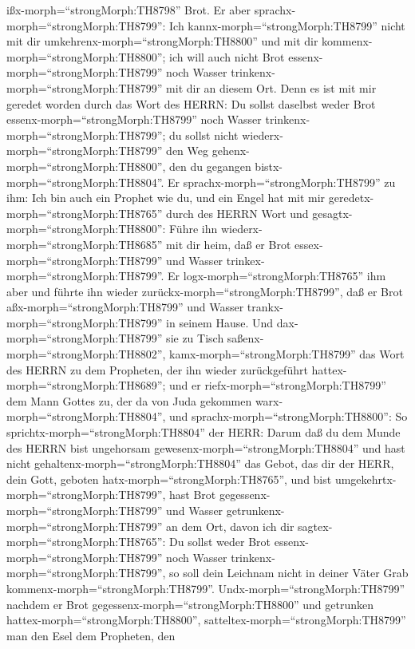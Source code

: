 ißx-morph=``strongMorph:TH8798'' Brot.  Er aber
sprachx-morph=``strongMorph:TH8799'': Ich
kannx-morph=``strongMorph:TH8799'' nicht mit dir
umkehrenx-morph=``strongMorph:TH8800'' und mit dir
kommenx-morph=``strongMorph:TH8800''; ich will auch nicht Brot
essenx-morph=``strongMorph:TH8799'' noch Wasser
trinkenx-morph=``strongMorph:TH8799'' mit dir an diesem Ort.
 Denn es ist mit mir geredet worden durch das Wort des
HERRN: Du sollst daselbst weder Brot essenx-morph=``strongMorph:TH8799''
noch Wasser trinkenx-morph=``strongMorph:TH8799''; du sollst nicht
wiederx-morph=``strongMorph:TH8799'' den Weg
gehenx-morph=``strongMorph:TH8800'', den du gegangen
bistx-morph=``strongMorph:TH8804''.  Er
sprachx-morph=``strongMorph:TH8799'' zu ihm: Ich bin auch ein Prophet
wie du, und ein Engel hat mit mir geredetx-morph=``strongMorph:TH8765''
durch des HERRN Wort und gesagtx-morph=``strongMorph:TH8800'': Führe ihn
wiederx-morph=``strongMorph:TH8685'' mit dir heim, daß er Brot
essex-morph=``strongMorph:TH8799'' und Wasser
trinkex-morph=``strongMorph:TH8799''. Er
logx-morph=``strongMorph:TH8765'' ihm aber  und führte ihn
wieder zurückx-morph=``strongMorph:TH8799'', daß er Brot
aßx-morph=``strongMorph:TH8799'' und Wasser
trankx-morph=``strongMorph:TH8799'' in seinem Hause.  Und
dax-morph=``strongMorph:TH8799'' sie zu Tisch
saßenx-morph=``strongMorph:TH8802'', kamx-morph=``strongMorph:TH8799''
das Wort des HERRN zu dem Propheten, der ihn wieder zurückgeführt
hattex-morph=``strongMorph:TH8689'';  und er
riefx-morph=``strongMorph:TH8799'' dem Mann Gottes zu, der da von Juda
gekommen warx-morph=``strongMorph:TH8804'', und
sprachx-morph=``strongMorph:TH8800'': So
sprichtx-morph=``strongMorph:TH8804'' der HERR: Darum daß du dem Munde
des HERRN bist ungehorsam gewesenx-morph=``strongMorph:TH8804'' und hast
nicht gehaltenx-morph=``strongMorph:TH8804'' das Gebot, das dir der
HERR, dein Gott, geboten hatx-morph=``strongMorph:TH8765'',
 und bist umgekehrtx-morph=``strongMorph:TH8799'', hast
Brot gegessenx-morph=``strongMorph:TH8799'' und Wasser
getrunkenx-morph=``strongMorph:TH8799'' an dem Ort, davon ich dir
sagtex-morph=``strongMorph:TH8765'': Du sollst weder Brot
essenx-morph=``strongMorph:TH8799'' noch Wasser
trinkenx-morph=``strongMorph:TH8799'', so soll dein Leichnam nicht in
deiner Väter Grab kommenx-morph=``strongMorph:TH8799''. 
Undx-morph=``strongMorph:TH8799'' nachdem er Brot
gegessenx-morph=``strongMorph:TH8800'' und getrunken
hattex-morph=``strongMorph:TH8800'',
satteltex-morph=``strongMorph:TH8799'' man den Esel dem Propheten, den
